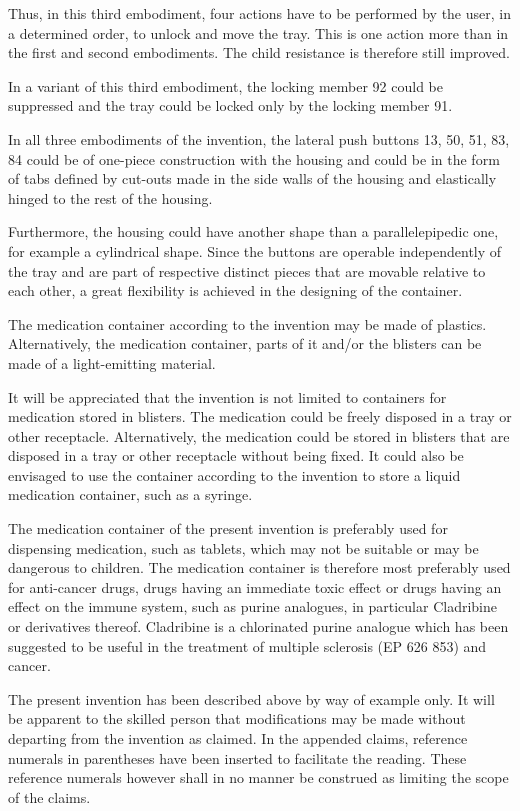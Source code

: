 \documentclass[11pt,a4paper]{article}
\begin{document}
Thus, in this third embodiment, four actions have to be performed by the user, in a determined order, to unlock and move the tray. This is one action more than in the first and second embodiments. The child resistance is therefore still improved.

In a variant of this third embodiment, the locking member 92 could be suppressed and the tray could be locked only by the locking member 91.

In all three embodiments of the invention, the lateral push buttons 13, 50, 51, 83, 84 could be of one-piece construction with the housing and could be in the form of tabs defined by cut-outs made in the side walls of the housing and elastically hinged to the rest of the housing.

Furthermore, the housing could have another shape than a parallelepipedic one, for example a cylindrical shape. Since the buttons are operable independently of the tray and are part of respective distinct pieces that are movable relative to each other, a great flexibility is achieved in the designing of the container.

The medication container according to the invention may be made of plastics. Alternatively, the medication container, parts of it and/or the blisters can be made of a light-emitting material.

It will be appreciated that the invention is not limited to containers for medication stored in blisters. The medication could be freely disposed in a tray or other receptacle. Alternatively, the medication could be stored in blisters that are disposed in a tray or other receptacle without being fixed. It could also be envisaged to use the container according to the invention to store a liquid medication container, such as a syringe.

The medication container of the present invention is preferably used for dispensing medication, such as tablets, which may not be suitable or may be dangerous to children. The medication container is therefore most preferably used for anti-cancer drugs, drugs having an immediate toxic effect or drugs having an effect on the immune system, such as purine analogues, in particular Cladribine or derivatives thereof. Cladribine is a chlorinated purine analogue which has been suggested to be useful in the treatment of multiple sclerosis (EP 626 853) and cancer.

The present invention has been described above by way of example only. It will be apparent to the skilled person that modifications may be made without departing from the invention as claimed. In the appended claims, reference numerals in parentheses have been inserted to facilitate the reading. These reference numerals however shall in no manner be construed as limiting the scope of the claims.
\end{document}
